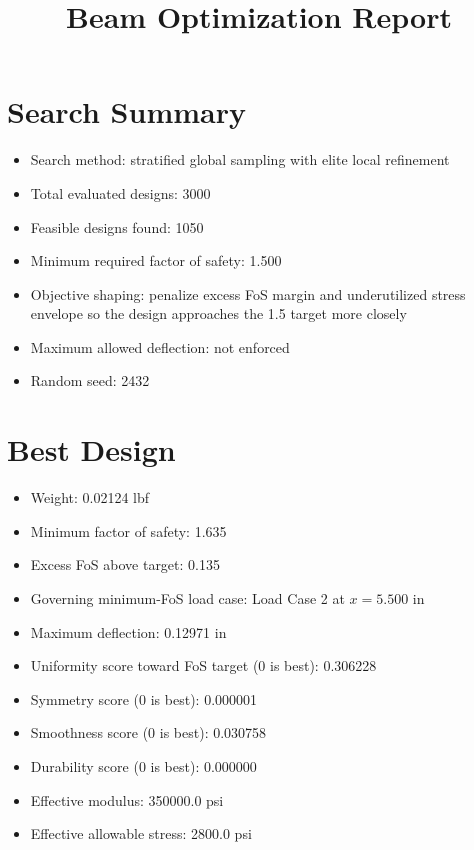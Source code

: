 \documentclass[11pt]{article}
\title{Beam Optimization Report}
\date{}
\begin{document}
\maketitle

\section*{Search Summary}
\begin{itemize}
\item Search method: stratified global sampling with elite local refinement
\item Total evaluated designs: 3000
\item Feasible designs found: 1050
\item Minimum required factor of safety: 1.500
\item Objective shaping: penalize excess FoS margin and underutilized stress envelope so the design approaches the 1.5 target more closely
\item Maximum allowed deflection: not enforced
\item Random seed: 2432
\end{itemize}

\section*{Best Design}
\begin{itemize}
\item Weight: 0.02124 lbf
\item Minimum factor of safety: 1.635
\item Excess FoS above target: 0.135
\item Governing minimum-FoS load case: Load Case 2 at $x=5.500$ in
\item Maximum deflection: 0.12971 in
\item Uniformity score toward FoS target (0 is best): 0.306228
\item Symmetry score (0 is best): 0.000001
\item Smoothness score (0 is best): 0.030758
\item Durability score (0 is best): 0.000000
\item Effective modulus: 350000.0 psi
\item Effective allowable stress: 2800.0 psi
\end{itemize}
\end{document}
